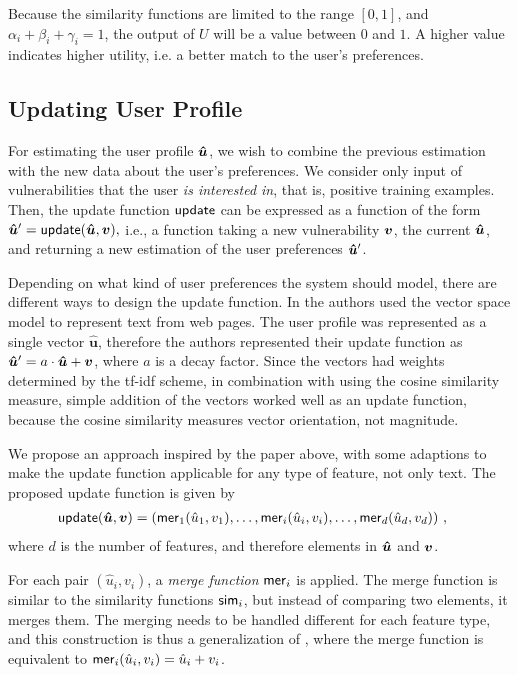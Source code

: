 {Because the similarity functions are limited to the range $[0, 1]$, and $\alpha_i + \beta_i + \gamma_i = 1$, the output of $U$ will be a value between $0$ and $1$.
A higher value indicates higher utility, i.e. a better match to the user's preferences.

\subsection{Updating User Profile} \label{sec:userprofileupdate}
For estimating the user profile $\bm{\hat{u}}$, we wish to combine the previous estimation with the new data about the user's preferences.
We consider only input of vulnerabilities that the user \emph{is interested in}, that is, positive training examples.
Then, the update function $\mathsf{update}$ can be expressed as a function of the form
$\bm{\hat{u}}' = \mathsf{update}(\bm{\hat{u}}, \bm{v}),$
i.e., a function taking a new vulnerability $\bm{v}$, the current $\bm{\hat{u}}$, and returning a new estimation of the user preferences $\bm{\hat{u}}'$.

Depending on what kind of user preferences the system should model, there are different ways to design the update function. In \cite{meteren:2000} the authors used the vector space model to represent text from web pages.
The user profile was represented as a single vector $\bm{\hat{u}}$, therefore the authors represented their update function as $\bm{\hat{u}}' = a \cdot \bm{\hat{u}} + \bm{v}$, where $a$ is a decay factor.
Since the vectors had weights determined by the tf-idf scheme, in combination with using the cosine similarity measure, simple addition of the vectors worked well as an update function, because the cosine similarity measures vector orientation, not magnitude.

We propose an approach inspired by the paper above, with some adaptions to make the update function applicable for any type of feature, not only text.
The proposed update function is given by
\begin{align}
\mathsf{update}(\bm{\hat{u}}, \bm{v}) &= \left( \mathsf{mer}_1 (\hat{u}_1, v_1), \ldots, \mathsf{mer}_i (\hat{u}_i, v_i), \ldots, \mathsf{mer}_d (\hat{u}_d, v_d) \right) \,,
\end{align}
where $d$ is the number of features, and therefore elements in $\bm{\hat{u}}$ and $\bm{v}$.

For each pair $(\hat{u}_i, v_i)$, a \emph{merge function} $\mathsf{mer}_i$ is applied. The merge function is similar to the similarity functions $\mathsf{sim}_i$, but instead of comparing two elements, it merges them.
The merging needs to be handled different for each feature type, and this construction is thus a generalization of \cite{chen:1998,meteren:2000}, where the merge function is equivalent to $\mathsf{mer}_i(\hat{u}_i, v_i) = \hat{u}_i + v_i$.

}
